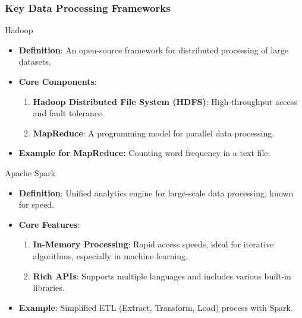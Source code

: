\documentclass[aspectratio=169]{beamer}
\begin{document}
\begin{frame}[fragile]
    \frametitle{Key Data Processing Frameworks}
    \begin{block}{Hadoop}
        \begin{itemize}
            \item \textbf{Definition}: An open-source framework for distributed processing of large datasets.
            \item \textbf{Core Components}:
            \begin{enumerate}
                \item \textbf{Hadoop Distributed File System (HDFS)}: High-throughput access and fault tolerance.
                \item \textbf{MapReduce}: A programming model for parallel data processing.
            \end{enumerate}
            \item \textbf{Example for MapReduce:} Counting word frequency in a text file.
        \end{itemize}
    \end{block}
    
    \begin{block}{Apache Spark}
        \begin{itemize}
            \item \textbf{Definition}: Unified analytics engine for large-scale data processing, known for speed.
            \item \textbf{Core Features}:
            \begin{enumerate}
                \item \textbf{In-Memory Processing}: Rapid access speeds, ideal for iterative algorithms, especially in machine learning.
                \item \textbf{Rich APIs}: Supports multiple languages and includes various built-in libraries.
            \end{enumerate}
            \item \textbf{Example}: Simplified ETL (Extract, Transform, Load) process with Spark.
        \end{itemize}
    \end{block}
\end{frame}
\end{document}
